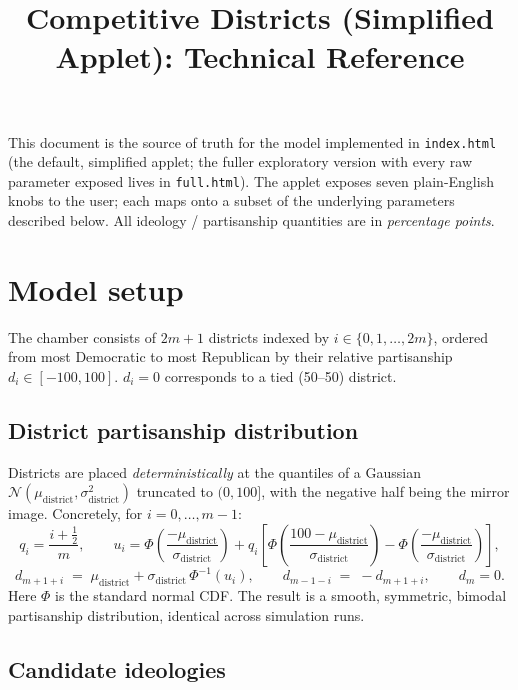 \documentclass[11pt]{article}
\title{Competitive Districts (Simplified Applet): Technical Reference}
\author{}
\date{}
\begin{document}
\maketitle

This document is the source of truth for the model implemented in
\texttt{index.html} (the default, simplified applet; the fuller exploratory
version with every raw parameter exposed lives in \texttt{full.html}).
The applet exposes seven plain-English knobs to the user; each maps onto a
subset of the underlying parameters described below.
All ideology / partisanship quantities are in \emph{percentage points}.

\section{Model setup}

The chamber consists of $2m+1$ districts indexed by
$i \in \{0, 1, \ldots, 2m\}$, ordered from most Democratic to most Republican
by their relative partisanship $d_i \in [-100, 100]$.
$d_i = 0$ corresponds to a tied (50--50) district.

\subsection{District partisanship distribution}

Districts are placed \emph{deterministically} at the quantiles of a Gaussian
$\mathcal{N}(\mu_{\text{district}}, \sigma_{\text{district}}^2)$ truncated to
$(0, 100]$, with the negative half being the mirror image. Concretely, for
$i = 0, \ldots, m-1$:
\[
  q_i = \frac{i + \tfrac{1}{2}}{m},
  \qquad
  u_i = \Phi\!\left(\frac{-\mu_{\text{district}}}{\sigma_{\text{district}}}\right)
        + q_i \left[
          \Phi\!\left(\frac{100-\mu_{\text{district}}}{\sigma_{\text{district}}}\right)
        - \Phi\!\left(\frac{-\mu_{\text{district}}}{\sigma_{\text{district}}}\right)
        \right],
\]
\[
  d_{m+1+i} \;=\; \mu_{\text{district}} + \sigma_{\text{district}} \, \Phi^{-1}(u_i),
  \qquad
  d_{m-1-i} \;=\; -d_{m+1+i},
  \qquad d_m = 0.
\]
Here $\Phi$ is the standard normal CDF. The result is a smooth, symmetric,
bimodal partisanship distribution, identical across simulation runs.

\subsection{Candidate ideologies}
\end{document}
